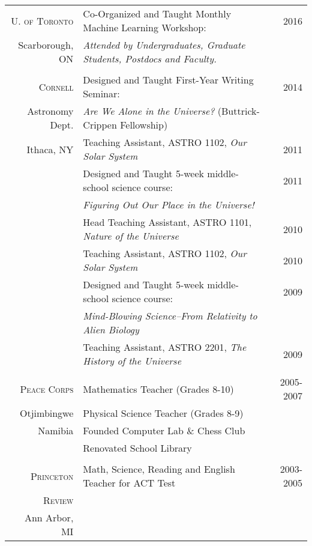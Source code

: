 \documentclass[10pt]{article} %
\begin{document}
\begin{tabular}{>{\hfill}r|p{11.2cm}r}


\textsc{U. of Toronto} & Co-Organized and Taught Monthly Machine Learning Workshop: & 2016 \\
Scarborough, ON & \hspace{0.25cm} {\it Attended by Undergraduates, Graduate Students, Postdocs and Faculty.} \\

\multicolumn{3}{c}{} \\
\textsc{Cornell} & Designed and Taught First-Year Writing Seminar: & 2014 \\
Astronomy Dept.& \hspace{0.25cm} {\it Are We Alone in the Universe?} (Buttrick-Crippen Fellowship) \\
Ithaca, NY & Teaching Assistant, ASTRO 1102, {\it Our Solar System} & 2011 \\
& Designed and Taught 5-week middle-school science course: & 2011\\
& \hspace{0.25cm} {\it Figuring Out Our Place in the Universe!} \\
& Head Teaching Assistant, ASTRO 1101, {\it Nature of the Universe} & 2010\\
& Teaching Assistant, ASTRO 1102, {\it Our Solar System} & 2010 \\
& Designed and Taught 5-week middle-school science course: & 2009\\
& \hspace{0.25cm} {\it Mind-Blowing Science--From Relativity to Alien Biology} \\
& Teaching Assistant, ASTRO 2201, {\it The History of the Universe} & 2009 \\
\multicolumn{3}{c}{} \\

\textsc{Peace Corps} & Mathematics Teacher (Grades 8-10) & 2005-2007\\
Otjimbingwe & Physical Science Teacher (Grades 8-9) \\
Namibia& Founded Computer Lab \& Chess Club \\
& Renovated School Library \\
\multicolumn{2}{c}{} \\

\textsc{Princeton} & Math, Science, Reading and English Teacher for ACT Test & 2003-2005\\
\textsc{Review} \\
Ann Arbor, MI
\end{tabular}
\end{document}
